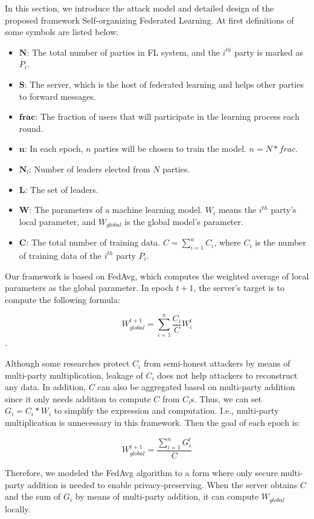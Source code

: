 In this section, we introduce the attack model and detailed design of the proposed framework Self-organizing Federated Learning. At first definitions of some symbols are listed below:
\begin{itemize}
    \item $\textbf{N}$: The total number of parties in FL system, and the  $i^{th}$ party is marked as $P_i$.
    \item $\textbf{S}$: The server, which is the host of federated learning and helps other parties to forward messages.
    \item $\textbf{frac}$: The fraction of users that will participate in the learning process each round.
    \item $\textbf{n}$: In each epoch, $n$ parties will be chosen to train the model. $n = N * frac$.
    \item $\textbf{N}_l$: Number of leaders elected from $N$ parties.
    \item $\textbf{L}$: The set of leaders.
    \item $\textbf{W}$: The parameters of a machine learning model. $W_i$ means the $i^{th}$ party's local parameter, and $W_{global}$ is the global model's parameter.
    \item $\textbf{C}$: The total number of training data. $C = \sum_{i=1}^nC_i$, where $C_i$ is the number of training data of the $i^{th}$ party $P_i$.
\end{itemize}

Our framework is based on FedAvg, which computes the weighted average of local parameters as the global parameter. In epoch $t+1$, the server's target is to compute the following formula:

$$W_{global}^{t+1} = \sum_{i=1}^n\frac{C_i}{C}W_i^t$$. 

Although some researches protect $C_i$ from semi-honest attackers by means of multi-party multiplication, leakage of $C_i$ does not help attackers to reconstruct any data. In addition, $C$ can also be aggregated based on multi-party addition since it only needs addition to compute $C$ from $C_i$s. Thus, we can set $G_i = C_i * W_i$ to simplify the expression and computation. I.e., multi-party multiplication is unnecessary in this framework. Then the goal of each epoch is:

$$ W_{global}^{t+1} = \frac{\sum_{i=1}^nG_i^t}{C} $$

Therefore, we modeled the FedAvg algorithm to a form where only secure multi-party addition is needed to enable privacy-preserving. When the server obtains $C$ and the sum of $G_i$ by means of multi-party addition, it can compute $W_{global}$ locally.

